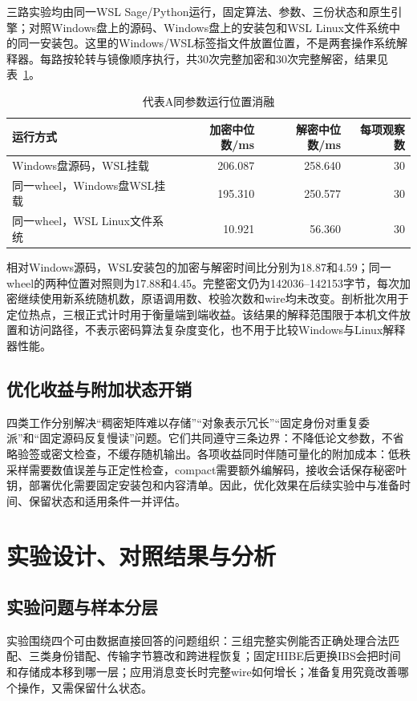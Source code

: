 \documentclass[UTF8,a4paper,12pt,oneside,openany,fontset=fandol]{ctexrep}
\begin{document}
三路实验均由同一WSL Sage/Python运行，固定算法、参数、三份状态和原生引擎；对照Windows盘上的源码、Windows盘上的安装包和WSL Linux文件系统中的同一安装包。这里的Windows/WSL标签指文件放置位置，不是两套操作系统解释器。每路按轮转与镜像顺序执行，共30次完整加密和30次完整解密，结果见表~\ref{tab:placement-ablation}。

\begin{table}[htbp]
\centering
\small
\caption{代表A同参数运行位置消融}
\label{tab:placement-ablation}
\begin{tabularx}{\textwidth}{@{}>{\raggedright\arraybackslash}Xrrr@{}}
\toprule
\rowcolor{black!8} 运行方式 & 加密中位数/ms & 解密中位数/ms & 每项观察数 \\
\midrule
Windows盘源码，WSL挂载 & 206.087 & 258.640 & 30 \\
同一wheel，Windows盘WSL挂载 & 195.310 & 250.577 & 30 \\
同一wheel，WSL Linux文件系统 & 10.921 & 56.360 & 30 \\
\bottomrule
\end{tabularx}
\end{table}

相对Windows源码，WSL安装包的加密与解密时间比分别为18.87和4.59；同一wheel的两种位置对照则为17.88和4.45。完整密文仍为142036--142153字节，每次加密继续使用新系统随机数，原语调用数、校验次数和wire均未改变。剖析批次用于定位热点，三根正式计时用于衡量端到端收益。该结果的解释范围限于本机文件放置和访问路径，不表示密码算法复杂度变化，也不用于比较Windows与Linux解释器性能。

\section{优化收益与附加状态开销}
四类工作分别解决“稠密矩阵难以存储”“对象表示冗长”“固定身份对重复委派”和“固定源码反复慢读”问题。它们共同遵守三条边界：不降低论文参数，不省略验签或密文检查，不缓存随机输出。各项收益同时伴随可量化的附加成本：低秩采样需要数值误差与正定性检查，compact需要额外编解码，接收会话保存秘密叶钥，部署优化需要固定安装包和内容清单。因此，优化效果在后续实验中与准备时间、保留状态和适用条件一并评估。

\chapter{实验设计、对照结果与分析}

\section{实验问题与样本分层}
实验围绕四个可由数据直接回答的问题组织：三组完整实例能否正确处理合法匹配、三类身份错配、传输字节篡改和跨进程恢复；固定HIBE后更换IBS会把时间和存储成本移到哪一层；应用消息变长时完整wire如何增长；准备复用究竟改善哪个操作，又需保留什么状态。
\end{document}
